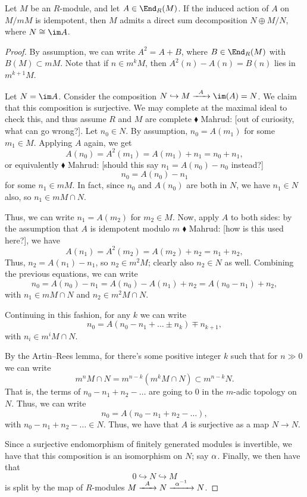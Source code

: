 \documentclass{article}
\let\inc\hookrightarrow
\numberwithin{equation}{section}
\theoremstyle{theorem}
\numberwithin{thm}{section}
\theoremstyle{definition}
\newcommand{\mahrud}[1]{{\color{ForestGreen} \sf $\blacklozenge$ Mahrud: [#1]}}
\begin{document}
\begin{lem}
  Let $M$ be an $R$-module, and let $A\in\End_R(M)$. If the induced action of $A$ on $M/mM$ is idempotent, then $M$ admits a direct sum decomposition $N\oplus M/N$, where $N\cong \im A$.
\end{lem}
\begin{proof}
  By assumption, we can write $A^2 = A + B$, where $B\in\End_R(M)$ with $B(M)\subset mM$.
  Note that if $n \in m^kM$, then $A^2(n) - A(n) = B(n)$  lies in $m^{k+1}M$.

  Let $N = \im A$. Consider the composition $N\inc M \xra{A} \im(A) = N$. We claim that this composition is surjective. We may complete at the maximal ideal to check this, and thus assume $R$ and $M$ are complete\mahrud{out of curiosity, what can go wrong?}. Let $n_0\in N$. By assumption, $n_0=A(m_1)$ for some $m_1\in M$. Applying $A$ again, we get
  \[ A(n_0) = A^2(m_1) = A(m_1) + n_1 = n_0 + n_1, \]
  or equivalently \mahrud{should this say $n_1 = A(n_0) - n_0$ instead?}
  \[ n_0 = A(n_0) - n_1 \]
  for some $n_1\in mM$. In fact, since $n_0$ and $A(n_0)$ are both in $N$, we have $n_1\in N$ also, so $n_1\in mM\cap N$.

  Thus, we can write $n_1 = A(m_2)$ for $m_2\in M$.
  Now, apply $A$ to both sides: by the assumption that $A$ is idempotent modulo $m$\mahrud{how is this used here?}, we have
  \[ A(n_1)=A^2(m_2) = A(m_2) + n_2 = n_1+n_2, \]
  Thus, $n_2=A(n_1)-n_1$, so $n_2\in m^2M$; clearly also $n_2\in N$ as well.
  Combining the previous equations, we can write
  \[ n_0 = A(n_0) - n_1 = A(n_0) - A(n_1) + n_2 = A(n_0 - n_1) + n_2, \]
  with $n_1\in mM\cap N$ and $n_2\in m^2M\cap N$.

  Continuing in this fashion, for any $k$ we can write
  \[ n_0=A(n_0-n_1+\dots \pm n_k) \mp n_{k+1}, \]
  with $n_i \in m^i M\cap N$.

  By the Artin--Rees lemma, for there's some positive integer $k$ such that for $n\gg0$ we can write
  \[ m^n M\cap N = m^{n-k} ( m^kM\cap N)\subset m^{n-k} N. \]
  That is, the terms of $n_0-n_1+n_2-\dots$ are going to 0 in the $m$-adic topology on $N$. Thus, we can write
  \[ n_0=A(n_0-n_1+n_2-\dots), \]
  with $n_0-n_1+n_2-\dots\in N$. Thus, we have that $A$ is surjective as a map $N\to N$.

  Since a surjective endomorphism of finitely generated modules is invertible, we have that this composition is an isomorphism on $N$; say $\alpha$.
  Finally, we then have that
  \[ 0 \inc N \inc M \]
  is split by the map of $R$-modules $M\xra A N\xra{\a\inv} N$.
\end{proof}
\end{document}
